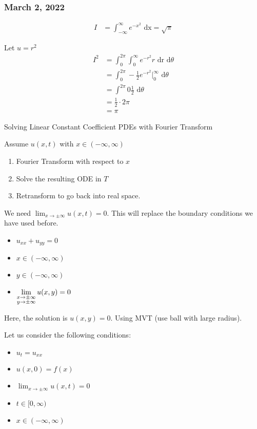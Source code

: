 \subsubsection*{March 2, 2022}
%
\begin{align}
  I & = \int^\infty_{-\infty} e^{-x^2} \text{ dx} = \sqrt{\pi}
\end{align}

Let $u = r^2$
%
\begin{align}
  I^2 & = \int^{2\pi}_0 \int^\infty_0 e^{-r^2} r \text{ dr d}\theta\\
  & = \int^{2\pi}_0 -\frac{1}{2} e^{-r^2} \Big|^\infty_0 \text{ d}\theta\\
  & = \int^{2 \pi}{0} \frac{1}{2} \text{ d}\theta\\
  & = \frac{1}{2} \cdot 2 \pi\\
  & = \pi
\end{align}

Solving Linear Constant Coefficient PDEs with Fourier Transform

Assume $u(x, t)$ with $x \in (-\infty, \infty)$
\begin{enumerate}
  \item Fourier Transform with respect to $x$
  \item Solve the resulting ODE in $T$
  \item Retransform to go back into real space.
\end{enumerate}

We need $\displaystyle \lim_{x \to \pm \infty} u(x, t) = 0$. This will replace the boundary conditions we have used before.

\hrulefill

\begin{itemize}
  \item $u_{xx} + u_{yy} = 0$
  \item $x \in (-\infty, \infty)$
  \item $y \in (-\infty, \infty)$
  \item $\displaystyle \lim_{\substack{x \to \pm \infty \\ y \to \pm \infty}} u(x, y) = 0$
\end{itemize}
Here, the solution is $u(x, y) = 0$. Using MVT (use ball with large radius).

\hrulefill


Let us consider the following conditions:
%
\begin{itemize}
  \item $u_t = u_{xx}$
  \item $u(x, 0) = f(x)$
  \item $\displaystyle \lim_{x \to \pm \infty} u(x, t) = 0$
  \item $t \in [0, \infty)$
  \item $x \in (-\infty, \infty)$
\end{itemize}

